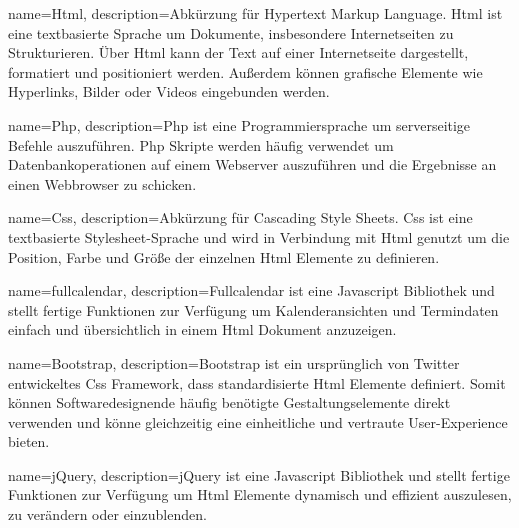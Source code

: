 {
    name=Html,
    description={Abkürzung für Hypertext Markup Language. Html ist eine textbasierte Sprache um Dokumente, insbesondere Internetseiten zu Strukturieren. Über Html kann der Text auf einer Internetseite dargestellt, formatiert und positioniert werden. Außerdem können grafische Elemente wie Hyperlinks, Bilder oder Videos eingebunden werden.\cite{Html}}
}

{
    name=Php,
    description={Php ist eine Programmiersprache um serverseitige Befehle auszuführen. Php Skripte werden häufig verwendet um Datenbankoperationen auf einem Webserver auszuführen und die Ergebnisse an einen Webbrowser zu schicken.\cite{Php}}
}

{
    name=Css,
    description={Abkürzung für Cascading Style Sheets. Css ist eine textbasierte Stylesheet-Sprache und wird in Verbindung mit \gls{Html} genutzt um die Position, Farbe und Größe der einzelnen Html Elemente zu definieren.\cite{Css}}
}

{
    name=fullcalendar,
    description={Fullcalendar ist eine \gls{Javascript} Bibliothek und stellt fertige Funktionen zur Verfügung um Kalenderansichten und Termindaten einfach und übersichtlich in einem \gls{Html} Dokument anzuzeigen.\cite{fullCalendarWeb}}
}

{
    name=Bootstrap,
    description={Bootstrap ist ein ursprünglich von Twitter entwickeltes \gls{Css} Framework, dass standardisierte \gls{Html} Elemente definiert. Somit können Softwaredesignende häufig benötigte Gestaltungselemente direkt verwenden und könne gleichzeitig eine einheitliche und vertraute User-Experience bieten.\cite{Bootstrap}}
}

{
    name=jQuery,
    description={jQuery ist eine \gls{Javascript} Bibliothek und stellt fertige Funktionen zur Verfügung um \gls{Html} Elemente dynamisch und effizient auszulesen, zu verändern oder einzublenden.\cite{jQuery}}
}
